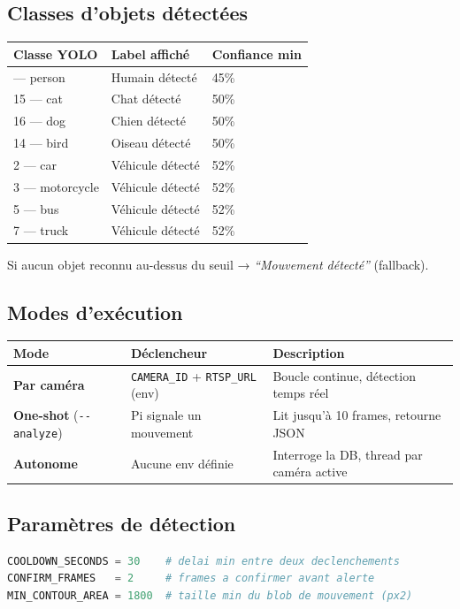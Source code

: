 \documentclass[12pt,a4paper]{article}
\begin{document}
\subsection{Classes d'objets détectées}

\begin{longtable}{|l|l|l|}
\hline
\textbf{Classe YOLO} & \textbf{Label affiché} & \textbf{Confiance min} \\
\hline
\endhead
\hline
\endfoot
0 — person & Humain détecté & 45\% \\
15 — cat & Chat détecté & 50\% \\
16 — dog & Chien détecté & 50\% \\
14 — bird & Oiseau détecté & 50\% \\
2 — car & Véhicule détecté & 52\% \\
3 — motorcycle & Véhicule détecté & 52\% \\
5 — bus & Véhicule détecté & 52\% \\
7 — truck & Véhicule détecté & 52\% \\
\hline
\end{longtable}

Si aucun objet reconnu au-dessus du seuil → \emph{``Mouvement détecté''} (fallback).

\subsection{Modes d'exécution}

\begin{longtable}{|l|l|p{7cm}|}
\hline
\textbf{Mode} & \textbf{Déclencheur} & \textbf{Description} \\
\hline
\endhead
\hline
\endfoot
\textbf{Par caméra} & \texttt{CAMERA\_ID} + \texttt{RTSP\_URL} (env) & Boucle continue, détection temps réel \\
\textbf{One-shot} (\texttt{-{}-analyze}) & Pi signale un mouvement & Lit jusqu'à 10 frames, retourne JSON \\
\textbf{Autonome} & Aucune env définie & Interroge la DB, thread par caméra active \\
\hline
\end{longtable}

\subsection{Paramètres de détection}

\begin{lstlisting}[language=python]
COOLDOWN_SECONDS = 30    # delai min entre deux declenchements
CONFIRM_FRAMES   = 2     # frames a confirmer avant alerte
MIN_CONTOUR_AREA = 1800  # taille min du blob de mouvement (px2)
\end{lstlisting}
\end{document}

